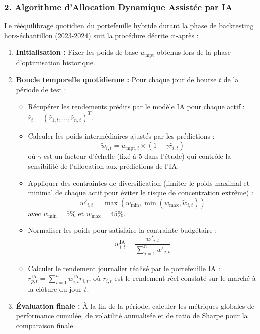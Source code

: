 \subsubsection{2. Algorithme d'Allocation Dynamique Assistée par IA}
Le rééquilibrage quotidien du portefeuille hybride durant la phase de backtesting hors-échantillon (2023-2024) suit la procédure décrite ci-après :
\begin{enumerate}
    \item \textbf{Initialisation :} Fixer les poids de base $w_{\text{mpt}}$ obtenus lors de la phase d'optimisation historique.
    \item \textbf{Boucle temporelle quotidienne :} Pour chaque jour de bourse $t$ de la période de test :
    \begin{itemize}
        \item Récupérer les rendements prédits par le modèle IA pour chaque actif : $\hat{r}_t = (\hat{r}_{1,t}, \dots, \hat{r}_{n,t})^T$.
        \item Calculer les poids intermédiaires ajustés par les prédictions :
        \begin{equation}
            \tilde{w}_{i,t} = w_{\text{mpt},i} \times (1 + \gamma \hat{r}_{i,t})
        \end{equation}
        où $\gamma$ est un facteur d'échelle (fixé à 5 dans l'étude) qui contrôle la sensibilité de l'allocation aux prédictions de l'IA.
        \item Appliquer des contraintes de diversification (limiter le poids maximal et minimal de chaque actif pour éviter le risque de concentration extrême) :
        \begin{equation}
            w'_{i,t} = \max\left(w_{\text{min}}, \min\left(w_{\text{max}}, \tilde{w}_{i,t}\right)\right)
        \end{equation}
        avec $w_{\text{min}} = 5\%$ et $w_{\text{max}} = 45\%$.
        \item Normaliser les poids pour satisfaire la contrainte budgétaire :
        \begin{equation}
            w_{i,t}^{\text{IA}} = \frac{w'_{i,t}}{\sum_{j=1}^n w'_{j,t}}
        \end{equation}
        \item Calculer le rendement journalier réalisé par le portefeuille IA : $r_{p,t}^{\text{IA}} = \sum_{i=1}^n w_{i,t}^{\text{IA}} r_{i,t}$, où $r_{i,t}$ est le rendement réel constaté sur le marché à la clôture du jour $t$.
    \end{itemize}
    \item \textbf{Évaluation finale :} À la fin de la période, calculer les métriques globales de performance cumulée, de volatilité annualisée et de ratio de Sharpe pour la comparaison finale.
\end{enumerate}

